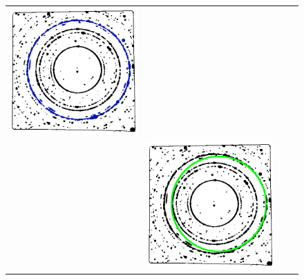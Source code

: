 \documentclass[preprint]{iucr}              %
\begin{document}
\begin{figure}
\begin{tabular}{>{\centering\arraybackslash}m{.1\linewidth}>{\centering\arraybackslash}m{.25\linewidth}>{\centering\arraybackslash}m{.25\linewidth}>{\centering\arraybackslash}m{.25\linewidth}}
\includegraphics[width=\linewidth]{Detail/o_Si12_0002_R_2_6.png}
\\
{\color{green}Ellipse}&\includegraphics[width=\linewidth]{Detail/o_Si12_0002_E_2_1.png}&

\end{tabular}
\end{figure}
\end{document}
